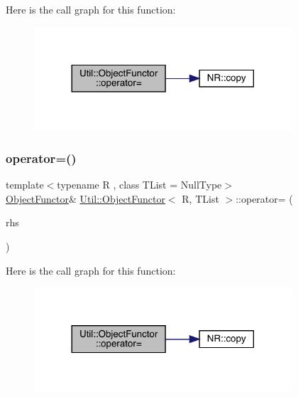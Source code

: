 Here is the call graph for this function\+:
\nopagebreak
\begin{figure}[H]
\begin{center}
\leavevmode
\includegraphics[width=272pt]{d3/de7/classUtil_1_1ObjectFunctor_a90395c8be24965e154bee2f7813a78e8_cgraph}
\end{center}
\end{figure}
\mbox{\label{classUtil_1_1ObjectFunctor_a90395c8be24965e154bee2f7813a78e8}} 
\subsubsection{\texorpdfstring{operator=()}{operator=()}\hspace{0.1cm}{\footnotesize\ttfamily [2/3]}}
{\footnotesize\ttfamily template$<$typename R , class T\+List  = Null\+Type$>$ \\
\mbox{\hyperlink{classUtil_1_1ObjectFunctor}{Object\+Functor}}\& \mbox{\hyperlink{classUtil_1_1ObjectFunctor}{Util\+::\+Object\+Functor}}$<$ R, T\+List $>$\+::operator= (\begin{DoxyParamCaption}\item[{const \mbox{\hyperlink{classUtil_1_1ObjectFunctor}{Object\+Functor}}$<$ R, T\+List $>$ \&}]{rhs }\end{DoxyParamCaption})\hspace{0.3cm}{\ttfamily [inline]}}

Here is the call graph for this function\+:
\nopagebreak
\begin{figure}[H]
\begin{center}
\leavevmode
\includegraphics[width=272pt]{d3/de7/classUtil_1_1ObjectFunctor_a90395c8be24965e154bee2f7813a78e8_cgraph}
\end{center}
\end{figure}
\mbox{\label{classUtil_1_1ObjectFunctor_a90395c8be24965e154bee2f7813a78e8}} 
